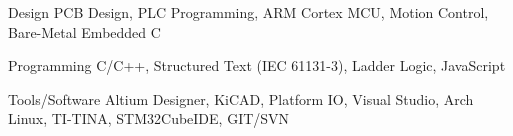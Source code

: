 


\begin{cvskills}

    \cvskill
    {Design} %
    {PCB Design, PLC Programming, ARM Cortex MCU, Motion Control, Bare-Metal Embedded C} %

    \cvskill
    {Programming} %
    {C/C++, Structured Text (IEC 61131-3), Ladder Logic, JavaScript } %



    \cvskill
    {Tools/Software} %
    {Altium Designer, KiCAD, Platform IO, Visual Studio, Arch Linux, TI-TINA, STM32CubeIDE, GIT/SVN} %


\end{cvskills}